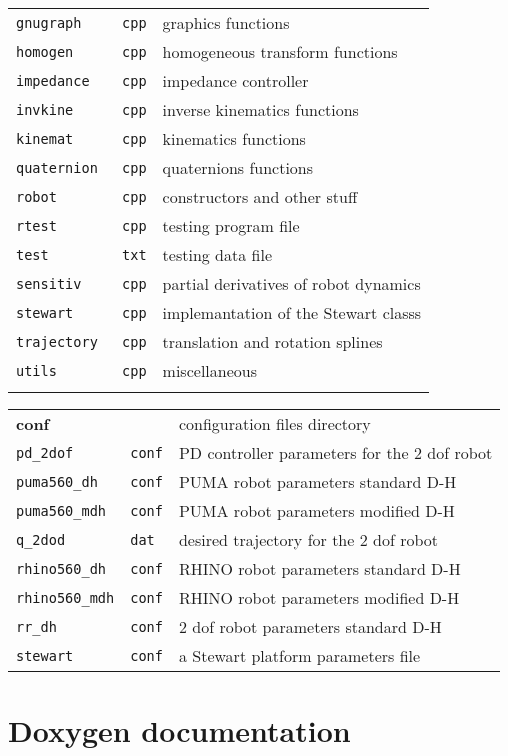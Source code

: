 \documentclass[11pt,fleqn,letterpaper]{report}
\begin{document}
{\begin{tabular}{lll}
{\tt gnugraph } & {\tt cpp} & graphics functions \\
{\tt homogen } & {\tt cpp} & homogeneous transform functions \\
{\tt impedance} & {\tt cpp} & impedance controller \\
{\tt invkine } & {\tt cpp} & inverse kinematics functions  \\
{\tt kinemat } & {\tt cpp} & kinematics functions  \\
{\tt quaternion } & {\tt cpp} & quaternions functions  \\
{\tt robot   } & {\tt cpp} & constructors and other stuff \\
{\tt rtest   } & {\tt cpp} & testing program file \\
{\tt test   } & {\tt txt} & testing data file \\
{\tt sensitiv} & {\tt cpp} & partial derivatives of robot dynamics \\
{\tt stewart} & {\tt cpp} & implemantation of the Stewart classs \\
{\tt trajectory} & {\tt cpp} & translation and rotation splines \\
{\tt utils} & {\tt cpp} & miscellaneous \\ \\
\end{tabular}

\begin{tabular}{lll}
{\bf conf} & & configuration files directory \\
\texttt{pd\_2dof} & \texttt{conf} & PD controller parameters for the 2 dof robot \\
\texttt{puma560\_dh} & \texttt{conf} & PUMA robot parameters standard D-H \\
\texttt{puma560\_mdh} & \texttt{conf} & PUMA robot parameters modified D-H \\
\texttt{q\_2dod} & \texttt{dat} & desired trajectory for the 2 dof robot \\
\texttt{rhino560\_dh} & \texttt{conf} & RHINO robot parameters standard D-H \\
\texttt{rhino560\_mdh} & \texttt{conf} & RHINO robot parameters modified D-H \\
\texttt{rr\_dh} & \texttt{conf} & 2 dof robot parameters standard D-H \\
\texttt{stewart} & \texttt{conf} & a Stewart platform parameters file 
\end{tabular}
}

\section{Doxygen documentation}
\end{document}
